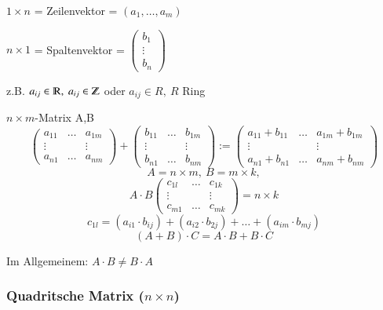 $1 \times n$ = Zeilenvektor = $(a_1,\ldots,a_m)$

$n \times 1$ = Spaltenvektor = $\begin{pmatrix} b_1 \\ \vdots \\ b_n \end{pmatrix}$

z.B. $a_{ij} \in \R,\ a_{ij} \in \Z$ oder $a_{ij} \in R,\ R$ Ring

$n \times m$-Matrix A,B
\[
	\begin{pmatrix}
		a_{11} & \ldots & a_{1m} \\
		\vdots &  & \vdots \\
		a_{n1} & \ldots & a_{nm}
	\end{pmatrix}
	+
	\begin{pmatrix}
		b_{11} & \ldots & b_{1m} \\
		\vdots &  & \vdots \\
		b_{n1} & \ldots & b_{nm}
	\end{pmatrix}
	:=
	\begin{pmatrix}
		a_{11}+b_{11} & \ldots & a_{1m}+b_{1m} \\
		\vdots &  & \vdots \\
		a_{n1}+b_{n1} & \ldots & a_{nm}+b_{nm}
	\end{pmatrix}
\]
\[
	A=n\times m,\ B = m \times k,
\]
\[
	A \cdot B
	\begin{pmatrix}
		c_{1l} & \ldots & c_{1k} \\
		\vdots &  & \vdots \\
		c_{m1} & \ldots & c_{mk}
	\end{pmatrix}
	=
	n\times k
\]
\[
	c_{1l}=(a_{i1} \cdot b_{ij})+(a_{i2} \cdot b_{2j}) + \ldots + (a_{im} \cdot b_{mj})
\]
\[
	(A+B)\cdot C = A\cdot B + B \cdot C
\]

Im Allgemeinem: $A\cdot B \neq B\cdot A$\\

\subsubsection{Quadritsche Matrix ($n\times n$)}

